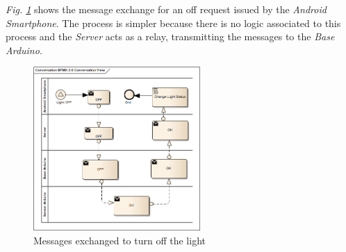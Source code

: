 \documentclass[conference, a4paper]{IEEEtran}
\begin{document}
\textit{Fig. \ref{fig_off_f}} shows the message exchange for an off request issued by the \textit{Android Smartphone}. The process is simpler because there is no logic associated to this process and the \textit{Server} acts as a relay, transmitting the messages to the \textit{Base Arduino}.

\begin{figure}[H]
\centering
\includegraphics[width=2.5in]{OFF_Flow}
\caption{Messages exchanged to turn off the light}
\label{fig_off_f}
\end{figure}


%
%

\end{document}
